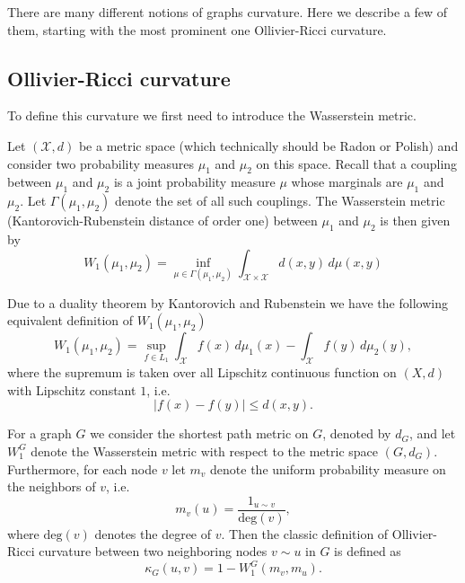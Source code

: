\documentclass{article}
\begin{document}
There are many different notions of graphs curvature. Here we describe a few of them, starting with the most prominent one Ollivier-Ricci curvature.

\subsection{Ollivier-Ricci curvature}

To define this curvature we first need to introduce the Wasserstein metric.

Let $(\mathcal{X},d)$ be a metric space (which technically should be Radon or Polish) and consider two probability measures $\mu_1$ and $\mu_2$ on this space. Recall that a coupling between $\mu_1$ and $\mu_2$ is a joint probability measure $\mu$ whose marginals are $\mu_1$ and $\mu_2$. Let $\Gamma(\mu_1, \mu_2)$ denote the set of all such couplings. The Wasserstein metric (Kantorovich-Rubenstein distance of order one) between $\mu_1$ and $\mu_2$ is then given by
\begin{equation}\label{eq:def_wasserstein_inf}
	W_1(\mu_1, \mu_2) = \inf_{\mu \in \Gamma(\mu_1, \mu_2)} \int_{\mathcal{X} \times \mathcal{X}} d(x,y) \, d\mu(x,y)
\end{equation}

Due to a duality theorem by Kantorovich and Rubenstein we have the following equivalent definition of $W_1(\mu_1, \mu_2)$
\begin{equation}\label{eq:def_wasserstein_sup}
	W_1(\mu_1, \mu_2) = \sup_{f \in L_1} \int_\mathcal{X} f(x) \, d\mu_1(x) - \int_\mathcal{X} f(y) \, d\mu_2(y),
\end{equation}
where the supremum is taken over all Lipschitz continuous function on $(X,d)$ with Lipschitz constant $1$, i.e.
\[
	|f(x) - f(y)| \le d(x,y).
\]

For a graph $G$ we consider the shortest path metric on $G$, denoted by $d_G$, and let $W_1^G$ denote the Wasserstein metric with respect to the metric space $(G,d_G)$. Furthermore, for each node $v$ let $m_v$ denote the uniform probability measure on the neighbors of $v$, i.e.
\[
	m_v(u) = \frac{1_{u \sim v}}{\mathrm{deg}(v)},
\]
where $\mathrm{deg}(v)$ denotes the degree of $v$. Then the classic definition of Ollivier-Ricci curvature between two neighboring nodes $v \sim u$ in $G$ is defined as
\begin{equation}\label{eq:def_classic_ollivier_graphs}
	\kappa_G(u,v) = 1 - W_1^G(m_v, m_u).
\end{equation}
\end{document}
